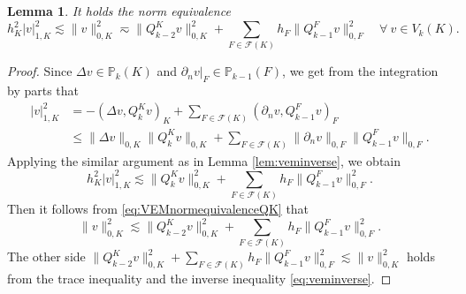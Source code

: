 \documentclass[10pt]{amsart}
\newtheorem{lemma}[theorem]{Lemma}
\numberwithin{equation}{section}
\begin{document}
\begin{lemma}
It holds the norm equivalence
\begin{equation}\label{eq:Vknormequivalence}
h_K^2|v|_{1,K}^2\lesssim\|v\|_{0,K}^2\eqsim \|Q_{k-2}^Kv\|_{0,K}^2+\sum_{F\in\mathcal F(K)}h_F\|Q_{k-1}^Fv\|_{0,F}^2 \quad\forall~v\in V_k(K).
\end{equation}  
\end{lemma}
\begin{proof}
Since $\Delta v\in\mathbb P_{k}(K)$ and $\partial_nv|_F\in\mathbb P_{k-1}(F)$, we get from the integration by parts that
\begin{align*}
|v|_{1,K}^2&=-(\Delta v,Q_k^Kv)_K+\sum_{F\in\mathcal F(K)}(\partial_nv,Q_{k-1}^Fv)_{F} \\
&\leq\|\Delta v\|_{0,K}\|Q_k^Kv\|_{0,K}+\sum_{F\in\mathcal F(K)}\|\partial_nv\|_{0,F}\|Q_{k-1}^Fv\|_{0,F}.
\end{align*}
Applying the similar argument as in Lemma \ref{lem:veminverse}, we obtain
$$
h_K^2|v|_{1,K}^2\lesssim \|Q_k^Kv\|_{0,K}^2+\sum_{F\in\mathcal F(K)}h_F\|Q_{k-1}^Fv\|_{0,F}^2.
$$
Then it follows from \eqref{eq:VEMnormequivalenceQK} that
$$
\|v\|_{0,K}^2\lesssim \|Q_{k-2}^Kv\|_{0,K}^2+\sum_{F\in\mathcal F(K)}h_F\|Q_{k-1}^Fv\|_{0,F}^2.
$$
The other side $\|Q_{k-2}^Kv\|_{0,K}^2+\sum\limits_{F\in\mathcal F(K)}h_F\|Q_{k-1}^Fv\|_{0,F}^2\lesssim \|v\|_{0,K}^2$ holds from the trace inequality and the inverse inequality \eqref{eq:veminverse}.
\end{proof}


   
\end{document}
